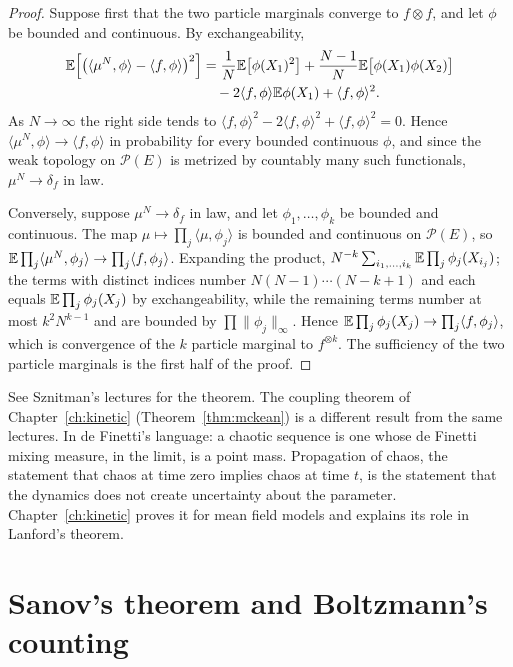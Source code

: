 \begin{proof}
Suppose first that the two particle marginals converge to $f\otimes f$, and let $\phi$ be bounded and continuous. By exchangeability,
\[
\begin{aligned}\mathbb{E}\Big[\big(\langle\mu^N,\phi\rangle-\langle f,\phi\rangle\big)^2\Big] &= \frac1N\mathbb{E}\big[\phi(X_1)^2\big]+\frac{N-1}{N}\mathbb{E}\big[\phi(X_1)\phi(X_2)\big]\\ &\quad-2\langle f,\phi\rangle\mathbb{E}\phi(X_1)+\langle f,\phi\rangle^2.\end{aligned}
\]
As $N\to\infty$ the right side tends to $\langle f,\phi\rangle^2-2\langle f,\phi\rangle^2+\langle f,\phi\rangle^2 = 0$. Hence $\langle\mu^N,\phi\rangle\to\langle f,\phi\rangle$ in probability for every bounded continuous $\phi$, and since the weak topology on $\mathcal{P}(E)$ is metrized by countably many such functionals, $\mu^N\to\delta_f$ in law.

Conversely, suppose $\mu^N\to\delta_f$ in law, and let $\phi_1,\dots,\phi_k$ be bounded and continuous. The map $\mu\mapsto\prod_j\langle\mu,\phi_j\rangle$ is bounded and continuous on $\mathcal{P}(E)$, so $\mathbb{E}\prod_j\langle\mu^N,\phi_j\rangle\to\prod_j\langle f,\phi_j\rangle$. Expanding the product, $N^{-k}\sum_{i_1,\dots,i_k}\mathbb{E}\prod_j\phi_j(X_{i_j})$; the terms with distinct indices number $N(N-1)\cdots(N-k+1)$ and each equals $\mathbb{E}\prod_j\phi_j(X_j)$ by exchangeability, while the remaining terms number at most $k^2N^{k-1}$ and are bounded by $\prod\|\phi_j\|_\infty$. Hence $\mathbb{E}\prod_j\phi_j(X_j)\to\prod_j\langle f,\phi_j\rangle$, which is convergence of the $k$ particle marginal to $f^{\otimes k}$. The sufficiency of the two particle marginals is the first half of the proof.
\end{proof}

See Sznitman's lectures for the theorem. The coupling theorem of Chapter~\ref{ch:kinetic} (Theorem~\ref{thm:mckean}) is a different result from the same lectures. In de Finetti's language: a chaotic sequence is one whose de Finetti mixing measure, in the limit, is a point mass. Propagation of chaos, the statement that chaos at time zero implies chaos at time $t$, is the statement that the dynamics does not create uncertainty about the parameter. Chapter~\ref{ch:kinetic} proves it for mean field models and explains its role in Lanford's theorem.

\section{Sanov's theorem and Boltzmann's counting}

